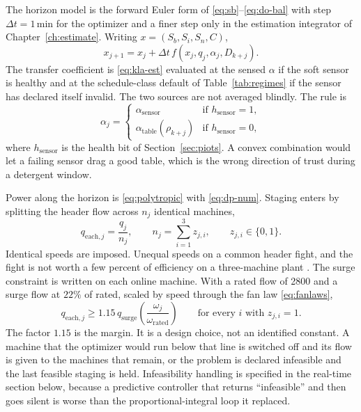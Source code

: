The horizon model is the forward Euler form of \eqref{eq:sb}--\eqref{eq:do-bal} with step $\Delta t=1\,\mathrm{min}$ for the optimizer and a finer step only in the estimation integrator of Chapter~\ref{ch:estimate}. Writing $x=(S_{b},S_{i},S_{n},C)$,
\begin{equation}
\label{eq:euler}
x_{j+1}
=
x_{j}
+
\Delta t\,
f\!\left(x_{j}, q_{j}, \alpha_{j}, D_{k+j}\right).
\end{equation}
The transfer coefficient is \eqref{eq:kla-est} evaluated at the sensed $\alpha$ if the soft sensor is healthy and at the schedule-class default of Table~\ref{tab:regimes} if the sensor has declared itself invalid. The two sources are not averaged blindly. The rule is
\begin{equation}
\label{eq:alpha-fuse}
\alpha_{j}
=
\begin{cases}
\alpha_{\mathrm{sensor}} & \text{if } h_{\mathrm{sensor}}=1,\\[0.3em]
\alpha_{\mathrm{table}}(\rho_{k+j}) & \text{if } h_{\mathrm{sensor}}=0,
\end{cases}
\end{equation}
where $h_{\mathrm{sensor}}$ is the health bit of Section~\ref{sec:piots}. A convex combination would let a failing sensor drag a good table, which is the wrong direction of trust during a detergent window.

Power along the horizon is \eqref{eq:polytropic} with \eqref{eq:dp-num}. Staging enters by splitting the header flow across $n_{j}$ identical machines,
\begin{equation}
\label{eq:split}
q_{\mathrm{each},j}
=
\frac{q_{j}}{n_{j}},
\qquad
n_{j}
=
\sum_{i=1}^{3} z_{j,i},
\qquad
z_{j,i}\in\{0,1\}.
\end{equation}
Identical speeds are imposed. Unequal speeds on a common header fight, and the fight is not worth a few percent of efficiency on a three-machine plant \cite{dixon2014turbo}. The surge constraint is written on each online machine. With a rated flow of \SI{2800}{\nmcph} and a surge flow at $22\%$ of rated, scaled by speed through the fan law \eqref{eq:fanlaws},
\begin{equation}
\label{eq:surge}
q_{\mathrm{each},j}
\ge
1.15\,
q_{\mathrm{surge}}
\left(\frac{\omega_{j}}{\omega_{\mathrm{rated}}}\right)
\qquad
\text{for every } i \text{ with } z_{j,i}=1.
\end{equation}
The factor $1.15$ is the margin. It is a design choice, not an identified constant. A machine that the optimizer would run below that line is switched off and its flow is given to the machines that remain, or the problem is declared infeasible and the last feasible staging is held. Infeasibility handling is specified in the real-time section below, because a predictive controller that returns ``infeasible'' and then goes silent is worse than the proportional-integral loop it replaced.

